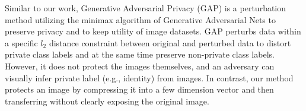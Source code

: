 Similar to our work, Generative Adversarial Privacy (GAP) \cite{GAP} is a perturbation method utilizing the minimax algorithm of Generative Adversarial Nets to preserve privacy and to keep utility of image datasets. GAP perturbs data within a specific $l_2$ distance constraint between original and perturbed data to distort private class labels and at the same time preserve non-private class labels. However, it does not protect the images themselves, and an adversary can visually infer private label (e.g., identity) from images. In contrast, our method protects an image by compressing it into a few dimension vector and then transferring without clearly exposing the original image.

 


